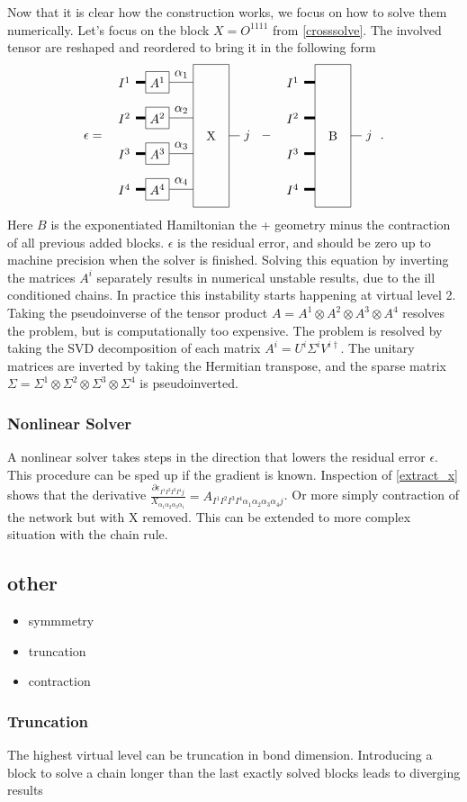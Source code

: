 \documentclass[twocolumn]{article}
\newcounter{a}
\newcounter{b}
\begin{document}
Now that it is clear how  the construction works, we focus on how to solve them numerically. Let's focus on the block $X=O^{1 1 1 1}$ from \cref{crosssolve}. The involved tensor are reshaped and reordered to bring it in the following form
\begin{equation}
    \epsilon = \vcenter{\hbox{ \pepoct }} - \vcenter{\hbox{  \blockct }} . \label{extract_x}
\end{equation}
Here $B$ is the exponentiated Hamiltonian the + geometry minus the contraction of all previous added blocks. $\epsilon$ is the residual error, and should be zero up to machine precision when the solver is finished. Solving this equation by inverting the matrices $A^i$ separately results in numerical unstable results, due to the ill conditioned chains. In practice this instability starts happening at virtual level 2. Taking the pseudoinverse of the tensor product  $A = A^1 \otimes A^2 \otimes A^3 \otimes A^4$  resolves the problem, but is  computationally too expensive. The problem is resolved by taking the SVD decomposition of each matrix $A^i = U^i \Sigma^i V^{i \dagger}$. The unitary matrices are inverted by taking the Hermitian transpose, and the sparse matrix $\Sigma = \Sigma^1 \otimes \Sigma^2 \otimes \Sigma^3 \otimes \Sigma^4$ is pseudoinverted.

\subsubsection{Nonlinear Solver}
A nonlinear solver takes steps in the direction that lowers the residual error $\epsilon$. This procedure can be sped up if the gradient is known. Inspection of \cref{extract_x} shows that the derivative  $\frac{\partial  \epsilon_{I^1 I^2 I^3 I^4 j }  }  { X_{\alpha_1 \alpha_2 \alpha_3 \alpha_1 } }   = A_{I^1 I^2 I^3 I^4 \alpha_1 \alpha_2 \alpha_3 \alpha_4 j } $. Or more simply contraction of the network but with X removed. This can be extended to more complex situation with the chain rule.
\subsection{other}

\begin{itemize}
    \item symmmetry
    \item truncation
    \item contraction
\end{itemize}

\subsubsection{Truncation}
The highest virtual level can be truncation in bond dimension. Introducing a block to solve a chain longer than the last exactly solved blocks leads to diverging results
\end{document}
